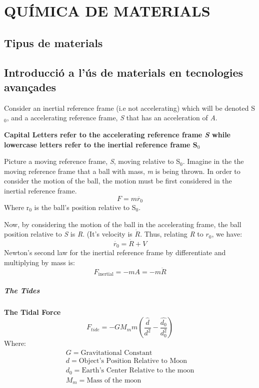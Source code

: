 \chapter{QUÍMICA DE MATERIALS}

\section{Tipus de materials}
\section{Introducció a l'ús de materials en tecnologies avançades}

Consider an inertial reference frame (i.e not accelerating) which will be denoted S$_0$, and a accelerating reference frame, \textit{S} that has an acceleration of \textit{A}. 
\begin{note}
\textbf{Capital Letters refer to the accelerating reference frame \textit{S} while lowercase letters refer to the inertial reference frame S$_0$}
\end{note}
Picture a moving reference frame, \textit{S}, moving relative to S$_0$. Imagine in the the moving reference frame that a ball with mass, \textit{m} is being thrown. 
In order to consider the motion of the ball, the motion must be first considered in the inertial reference frame. 
\begin{equation}
F = m\ddot{r_0}
\end{equation}
Where r$_0$ is the ball's position relative to S$_0$. 

Now, by considering the motion of the ball in the accelerating frame, the ball position relative to \textit{S} is \textit{R}. (It's velocity is $\dot{R}$. 
Thus, relating \textit{R} to $r_0$, we have: 
\begin{equation}
\dot{r_0} = \dot{R} + V
\end{equation}
Newton's second law for the inertial reference frame by differentiate and multiplying by mass is:
\begin{equation}
F_{\text{inertial}} = -mA = -m\ddot{R}
\end{equation}
\paragraph{The Tides}
\begin{shaded}
\textbf{The Tidal Force} \newline
\begin{equation}
F_{tide} = -GM_mm(\frac{\hat{d}}{d^2}-\frac{\hat{d_0}}{d_0^2})
\end{equation}
Where:
\begin{equation*}
\begin{split}
G = \text{Gravitational Constant} \\
d = \text{Object's Position Relative to Moon} \\
d_0 = \text{Earth's Center Relative to the moon}\\
M_m = \text{Mass of the moon}
\end{split}
\end{equation*}
\end{shaded}
\newpage
